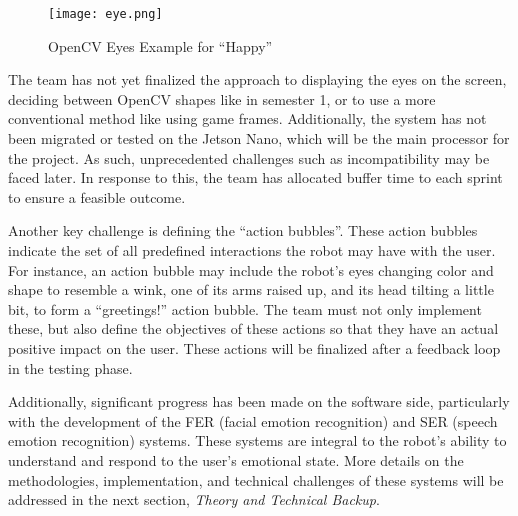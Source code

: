 \begin{figure}[ht]
      \centering
      \texttt{[image: eye.png]}
      \caption{OpenCV Eyes Example for “Happy”}
      \label{fig:eye}
\end{figure}

The team has not yet finalized the approach to displaying the eyes on the screen, deciding between OpenCV shapes like in semester 1, or to use a more conventional method like using game frames. Additionally, the system has not been migrated or tested on the Jetson Nano, which will be the main processor for the project. As such, unprecedented challenges such as incompatibility may be faced later. In response to this, the team has allocated buffer time to each sprint to ensure a feasible outcome.

Another key challenge is defining the “action bubbles”. These action bubbles indicate the set of all predefined interactions the robot may have with the user. For instance, an action bubble may include the robot’s eyes changing color and shape to resemble a wink, one of its arms raised up, and its head tilting a little bit, to form a “greetings!” action bubble. The team must not only implement these, but also define the objectives of these actions so that they have an actual positive impact on the user. These actions will be finalized after a feedback loop in the testing phase. 

Additionally, significant progress has been made on the software side, particularly with the development of the FER (facial emotion recognition) and SER (speech emotion recognition) systems. These systems are integral to the robot’s ability to understand and respond to the user’s emotional state. More details on the methodologies, implementation, and technical challenges of these systems will be addressed in the next section, \textit{Theory and Technical Backup}.